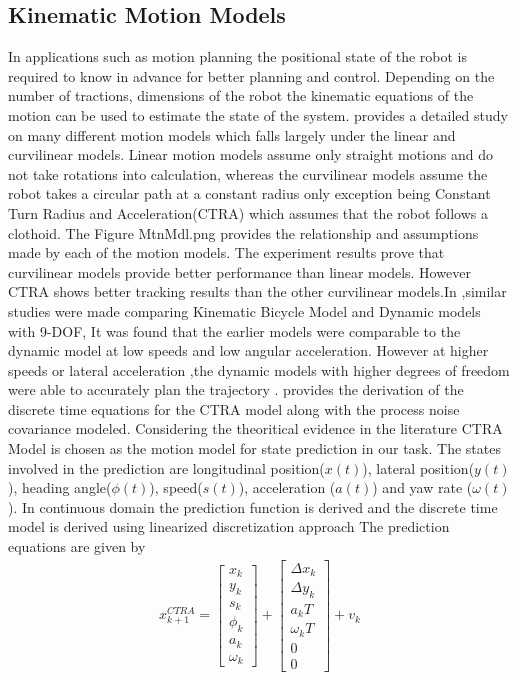 \subsection{Kinematic Motion Models}
In applications such as motion planning the positional state of the robot is required to know in advance for better planning and control. Depending on the number of tractions, dimensions of the robot the 
kinematic equations of the motion can be used to estimate the state of the system. \cite{R.Schubert} provides a detailed study on many different motion models which falls largely under the linear and curvilinear
models. Linear motion models assume only straight motions and do not take rotations into calculation, whereas the curvilinear models assume the robot takes a circular path at a constant radius only exception being 
Constant Turn  Radius and Acceleration(CTRA) which assumes that the robot follows a clothoid. The Figure \figurename{MtnMdl.png} provides the relationship and assumptions made by each of the motion models.
The experiment results prove that curvilinear models provide better performance than linear models. However CTRA shows better tracking results than the other curvilinear models.In \cite{},similar studies were made
comparing Kinematic Bicycle Model and Dynamic models with 9-DOF, It was found that the earlier models were comparable to the dynamic model at low speeds and low angular acceleration. However at higher speeds or lateral
acceleration ,the dynamic models with higher degrees of freedom were able to accurately plan the trajectory  .\cite{D.Svensson} provides the
derivation of the discrete time equations for the CTRA model along with the process noise covariance modeled. Considering the theoritical  evidence in the literature CTRA Model is chosen as the 
motion model for state prediction in our task. The states involved in the prediction are longitudinal position($x(t)$), lateral position($y(t)$), heading angle($\phi(t)$), speed($s(t)$),
acceleration ($a(t)$) and yaw rate ($\omega(t)$). In continuous domain the prediction function is derived and the discrete time model is derived using linearized discretization approach
The prediction equations are given by 
\begin{gather} \label{CTRA_pred_ct}
    x_{k+1}^{CTRA}
    =
    \begin{bmatrix} 
        x_k \\ y_k \\ s_k \\ \phi_k \\ a_k\\ \omega_k
    \end{bmatrix}
    +
    \begin{bmatrix} 
        \Delta x_k \\ \Delta y_k \\ a_k T \\ \omega_k T \\ 0 \\ 0
    \end{bmatrix}
    + v_k
\end{gather}
